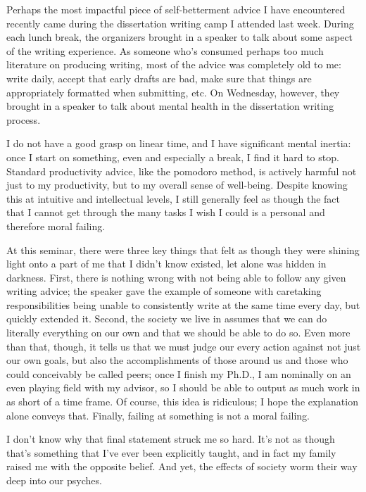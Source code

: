 \documentclass[12pt]{article}
\renewcommand{\,}{\textsuperscript{,}}
\begin{document}
Perhaps the most impactful piece of self-betterment advice I have encountered recently came during the dissertation writing camp I attended last week.  
During each lunch break, the organizers brought in a speaker to talk about some aspect of the writing experience.  
As someone who's consumed perhaps too much literature on producing writing, most of the advice was completely old to me: write daily, accept that early drafts are bad, make sure that things are appropriately formatted when submitting, etc.  
On Wednesday, however, they brought in a speaker to talk about mental health in the dissertation writing process.

I do not have a good grasp on linear time, and I have significant mental inertia: once I start on something, even and especially a break, I find it hard to stop.  
Standard productivity advice, like the pomodoro method, is actively harmful not just to my productivity, but to my overall sense of well-being.  
Despite knowing this at intuitive and intellectual levels, I still generally feel as though the fact that I cannot get through the many tasks I wish I could is a personal and therefore moral failing.

At this seminar, there were three key things that felt as though they were shining light onto a part of me that I didn't know existed, let alone was hidden in darkness.  
First, there is nothing wrong with not being able to follow any given writing advice; the speaker gave the example of someone with caretaking responsibilities being unable to consistently write at the same time every day, but quickly extended it.  
Second, the society we live in assumes that we can do literally everything on our own and that we should be able to do so.  
Even more than that, though, it tells us that we must judge our every action against not just our own goals, but also the accomplishments of those around us and those who could conceivably be called peers; once I finish my Ph.D., I am nominally on an even playing field with my advisor, so I should be able to output as much work in as short of a time frame.  
Of course, this idea is ridiculous; I hope the explanation alone conveys that.  
Finally, failing at something is not a moral failing.

I don't know why that final statement struck me so hard.  
It's not as though that's something that I've ever been explicitly taught, and in fact my family raised me with the opposite belief.  
And yet, the effects of society worm their way deep into our psyches.
\end{document}
